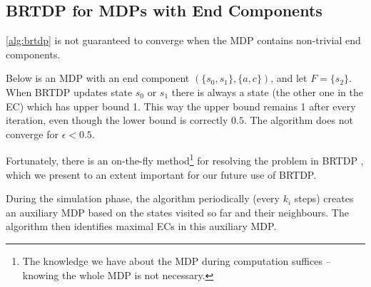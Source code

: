 \subsection*{BRTDP for MDPs with End Components}
\autoref{alg:brtdp} is not guaranteed to converge
when the MDP contains non-trivial end components.

\begin{example}
    Below is an MDP with an end component
    $(\{s_0, s_1\}, \{a,c\})$, and let $F = \{s_2\}$.
    When BRTDP updates state $s_0$ or $s_1$ there is always a state (the
    other one in the EC) which has upper bound 1. This way the upper
    bound remains 1 after every iteration, even though the lower bound
    is correctly $0.5$. The algorithm does not converge for $\epsilon <
    0.5$.

\begin{center}
\end{center}
\end{example}

Fortunately, there is an on-the-fly method\footnote{The knowledge we have
about the MDP during computation suffices -- knowing the whole MDP is
not necessary.}
for resolving the problem in BRTDP
\parencite{atva14}, which we present to an extent important for our
future use of BRTDP.

During the simulation phase, the algorithm periodically (every $k_i$
steps) creates an auxiliary MDP based on the states visited so far and
their neighbours. The algorithm then identifies maximal ECs in this auxiliary
MDP.

